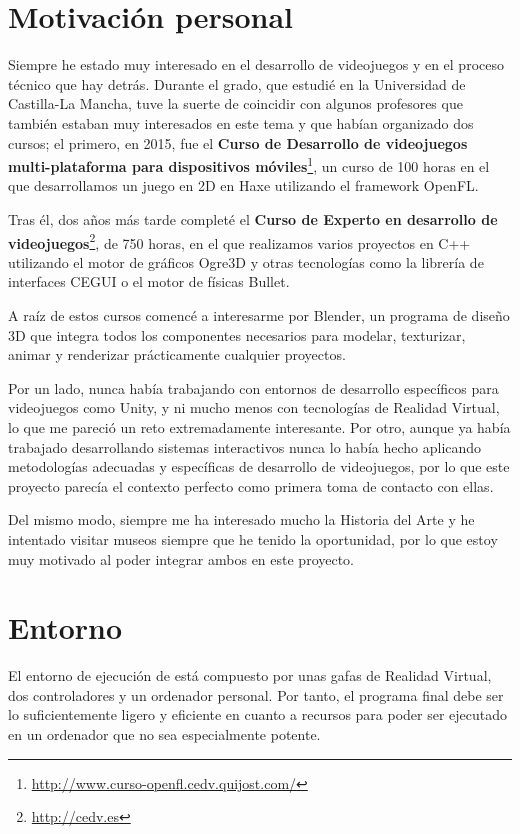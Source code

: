 \section{Motivación personal}

Siempre he estado muy interesado en el desarrollo de videojuegos y en el proceso técnico que hay detrás. Durante el grado, que estudié en la Universidad de Castilla-La Mancha, tuve la suerte de coincidir con algunos profesores que también estaban muy interesados en este tema y que habían organizado dos cursos; el primero, en 2015, fue el \textbf{Curso de Desarrollo de videojuegos multi-plataforma para dispositivos móviles}\footnote{\url{http://www.curso-openfl.cedv.quijost.com/}}, un curso de 100 horas en el que desarrollamos un juego en 2D en Haxe utilizando el framework OpenFL.

Tras él, dos años más tarde completé el \textbf{Curso de Experto en desarrollo de videojuegos}\footnote{\url{http://cedv.es}}, de 750 horas, en el que realizamos varios proyectos en C++ utilizando el motor de gráficos Ogre3D y otras tecnologías como la librería de interfaces CEGUI o el motor de físicas Bullet.

A raíz de estos cursos comencé a interesarme por Blender, un programa de diseño 3D que integra todos los componentes necesarios para modelar, texturizar, animar y renderizar prácticamente cualquier proyectos.

Por un lado, nunca había trabajando con entornos de desarrollo específicos para videojuegos como Unity, y ni mucho menos con tecnologías de Realidad Virtual, lo que me pareció un reto extremadamente interesante. Por otro, aunque ya había trabajado desarrollando sistemas interactivos nunca lo había hecho aplicando metodologías adecuadas y específicas de desarrollo de videojuegos, por lo que este proyecto parecía el contexto perfecto como primera toma de contacto con ellas.

Del mismo modo, siempre me ha interesado mucho la Historia del Arte y he intentado visitar museos siempre que he tenido la oportunidad, por lo que estoy muy motivado al poder integrar ambos en este proyecto.

\section{Entorno}

El entorno de ejecución de \MineRVa está compuesto por unas gafas de Realidad Virtual, dos controladores y un ordenador personal. Por tanto, el programa final debe ser lo suficientemente ligero y eficiente en cuanto a recursos para poder ser ejecutado en un ordenador que no sea especialmente potente.

